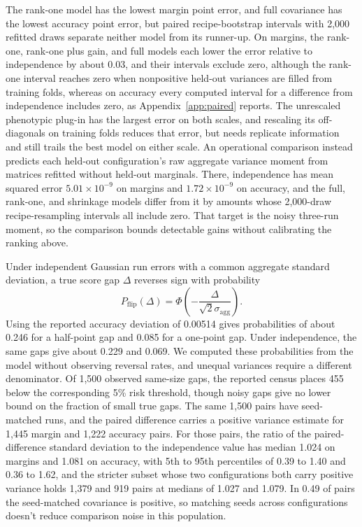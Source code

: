 \documentclass{article}
\begin{document}
The rank-one model has the lowest margin point error, and full covariance has the lowest accuracy point error, but paired recipe-bootstrap intervals with 2,000 refitted draws separate neither model from its runner-up. On margins, the rank-one, rank-one plus gain, and full models each lower the error relative to independence by about 0.03, and their intervals exclude zero, although the rank-one interval reaches zero when nonpositive held-out variances are filled from training folds, whereas on accuracy every computed interval for a difference from independence includes zero, as Appendix~\ref{app:paired} reports. The unrescaled phenotypic plug-in has the largest error on both scales, and rescaling its off-diagonals on training folds reduces that error, but needs replicate information and still trails the best model on either scale. An operational comparison instead predicts each held-out configuration's raw aggregate variance moment from matrices refitted without held-out marginals. There, independence has mean squared error $5.01\times10^{-9}$ on margins and $1.72\times10^{-9}$ on accuracy, and the full, rank-one, and shrinkage models differ from it by amounts whose 2,000-draw recipe-resampling intervals all include zero. That target is the noisy three-run moment, so the comparison bounds detectable gains without calibrating the ranking above.

Under independent Gaussian run errors with a common aggregate standard deviation, a true score gap $\Delta$ reverses sign with probability
\begin{equation}
P_{\mathrm{flip}}(\Delta)=\Phi\left(-\frac{\Delta}{\sqrt{2}\sigma_{\mathrm{agg}}}\right).
\end{equation}
Using the reported accuracy deviation of 0.00514 gives probabilities of about 0.246 for a half-point gap and 0.085 for a one-point gap. Under independence, the same gaps give about 0.229 and 0.069. We computed these probabilities from the model without observing reversal rates, and unequal variances require a different denominator. Of 1,500 observed same-size gaps, the reported census places 455 below the corresponding 5\% risk threshold, though noisy gaps give no lower bound on the fraction of small true gaps. The same 1,500 pairs have seed-matched runs, and the paired difference carries a positive variance estimate for 1,445 margin and 1,222 accuracy pairs. For those pairs, the ratio of the paired-difference standard deviation to the independence value has median 1.024 on margins and 1.081 on accuracy, with 5th to 95th percentiles of 0.39 to 1.40 and 0.36 to 1.62, and the stricter subset whose two configurations both carry positive variance holds 1,379 and 919 pairs at medians of 1.027 and 1.079. In 0.49 of pairs the seed-matched covariance is positive, so matching seeds across configurations doesn't reduce comparison noise in this population.
\end{document}

